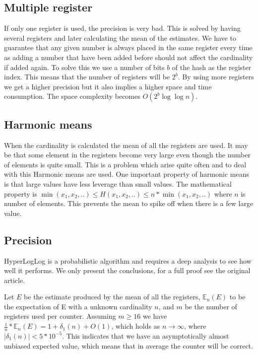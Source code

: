 \subsection{Multiple register}
If only one register is used, the precision is very bad. This is solved by having several registers and later calculating the mean of the estimates. We have to guarantee that any given number is always placed in the same register every time as adding a number that have been added before should not affect the cardinality if added again. To solve this we use a number of bits $b$ of the hash as the register index. This means that the number of registers will be $2^b$. By using more registers we get a higher precision but it also implies a higher space and time consumption. The space complexity becomes $O(2^b\log\log n)$. \cite{hyperloglog} 

\subsection{Harmonic means}
When the cardinality is calculated the mean of all the registers are used. It may be that some element in the registers become very large even though the number of elements is quite small. This is a problem which arise quite often and to deal with this Harmonic means are used. One important property of harmonic means is that large values have less leverage than small values. The mathematical property is $\min(x_1,x_2,..) \leq H(x_1,x_2,..) \leq n*\min(x_1,x_2,..)$ where $n$ is number of elements. This prevents the mean to spike off when there is a few large value.  

\subsection{Precision}
HyperLogLog is a probabilistic algorithm and requires a deep analysis to see how well it performs. We only present the conclusions, for a full proof see the original article. 

Let $E$ be the estimate produced by the mean of all the registers, $\mathbb{E}_n(E)$ to be the expectation of E with a unknown cardinality $n$, and $m$ be the number of registers used per counter. Assuming $m \geq 16$ we have $\frac{1}{n}*\mathbb{E}_n(E) = 1 + \delta_1(n) + O(1)$, which holds as $n \rightarrow \infty$, where $|\delta_1(n)| < 5*10^{-5}$. This indicates that we have an asymptotically almost unbiased expected value, which means that in average the counter will be correct. 

